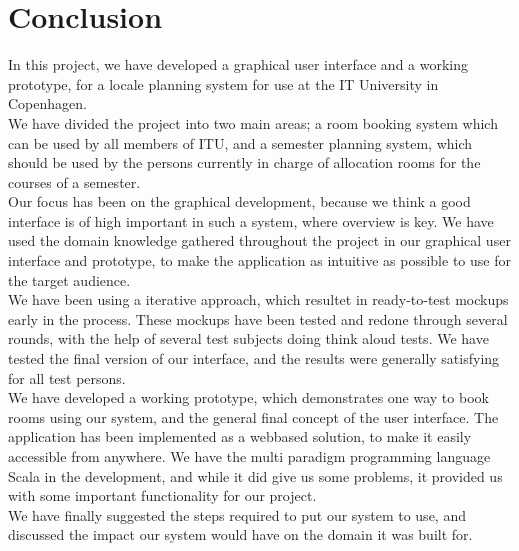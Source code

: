 \chapter{Conclusion}
In this project, we have developed a graphical user interface and a working prototype, for a locale planning system for use at the IT University in Copenhagen.\\
We have divided the project into two main areas; a room booking system which can be used by all members of ITU, and a semester planning system, which should be used by the persons currently in charge of allocation rooms for the courses of a semester.\\
Our focus has been on the graphical development, because we think a good interface is of high important in such a system, where overview is key. We have used the domain knowledge gathered throughout the project in our graphical user interface and prototype, to make the application as intuitive as possible to use for the target audience. \\

We have been using a iterative approach, which resultet in ready-to-test mockups early in the process. These mockups have been tested and redone through several rounds, with the help of several test subjects doing think aloud tests. We have tested the final version of our interface, and the results were generally satisfying for all test persons.\\

We have developed a working prototype, which demonstrates one way to book rooms using our system, and the general final concept of the user interface. The application has been implemented as a webbased solution, to make it easily accessible from anywhere. We have the multi paradigm programming language Scala in the development, and while it did give us some problems, it provided us with some important functionality for our project.\\

We have finally suggested the steps required to put our system to use, and discussed the impact our system would have on the domain it was built for.